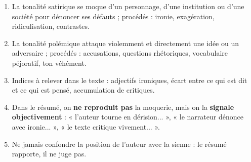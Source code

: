 \documentclass[11pt]{article}
\newcommand{\cle}[1]{{\popxbold\color{popdark}#1}}
\begin{document}
\begin{methode}
\begin{enumerate}
\item La tonalité \cle{satirique} se moque d'un personnage, d'une institution ou d'une société pour dénoncer ses défauts ; procédés : ironie, exagération, ridiculisation, contrastes.
\item La tonalité \cle{polémique} attaque violemment et directement une idée ou un adversaire ; procédés : accusations, questions rhétoriques, vocabulaire péjoratif, ton véhément.
\item Indices à relever dans le texte : adjectifs ironiques, écart entre ce qui est dit et ce qui est pensé, accumulation de critiques.
\item Dans le résumé, on \textbf{ne reproduit pas} la moquerie, mais on la \textbf{signale objectivement} : « l'auteur tourne en dérision... », « le narrateur dénonce avec ironie... », « le texte critique vivement... ».
\item Ne jamais confondre la position de l'auteur avec la sienne : le résumé rapporte, il ne juge pas.
\end{enumerate}
\end{methode}
\end{document}
